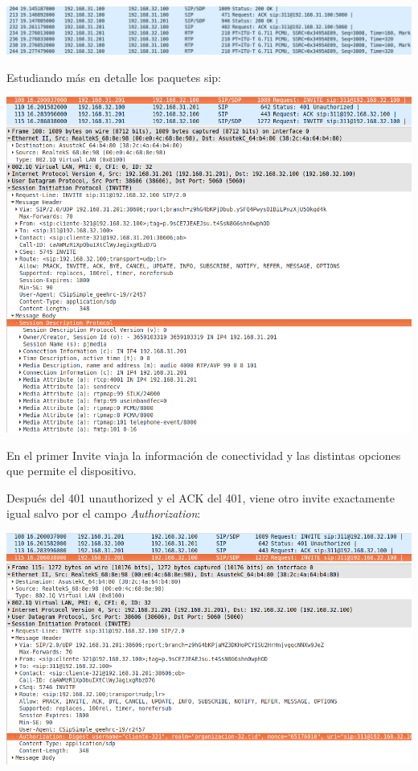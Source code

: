 \documentclass[]{article}
\begin{document}
\begin{center}
	\includegraphics[width=1\linewidth]{images/voip6}
\end{center}

Estudiando más en detalle los paquetes sip:

\begin{center}
	\includegraphics[width=1\linewidth]{images/voip7}
\end{center}

En el primer Invite viaja la información de conectividad y las distintas opciones que permite el dispositivo.

Después del 401 unauthorized y el ACK del 401, viene otro invite exactamente igual salvo por el campo \textit{Authorization}:

\begin{center}
	\includegraphics[width=1\linewidth]{images/voip8}
\end{center}
\end{document}
